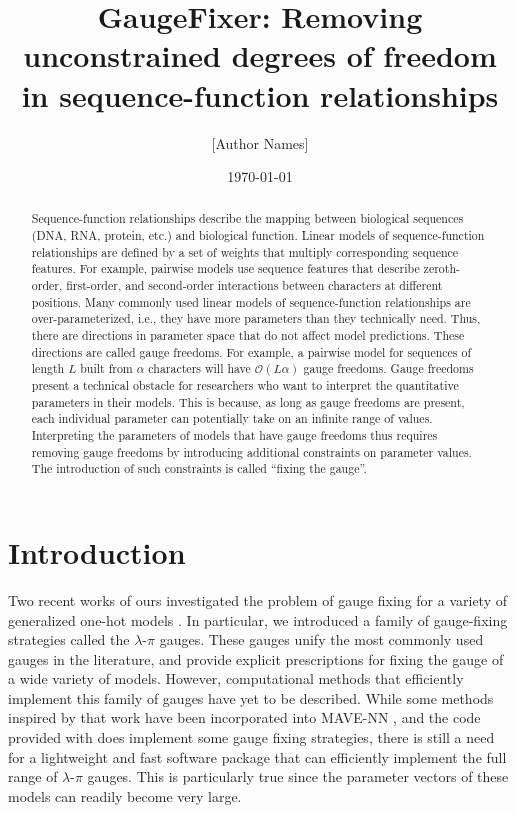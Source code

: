\documentclass[12pt,letterpaper]{article}
\title{GaugeFixer: Removing unconstrained degrees of freedom in sequence-function relationships}
\author{[Author Names]}
\date{\today}
\begin{document}
\maketitle

\begin{abstract}
Sequence-function relationships describe the mapping between biological sequences (DNA, RNA, protein, etc.) and biological function.
Linear models of sequence-function relationships are defined by a set of weights that multiply corresponding sequence features.
For example, pairwise models use sequence features that describe zeroth-order, first-order, and second-order interactions between characters at different positions. 
Many commonly used linear models of sequence-function relationships are over-parameterized, i.e., they have more parameters than they technically need. 
Thus, there are directions in parameter space that do not affect model predictions. These directions are called gauge freedoms. 
For example, a pairwise model for sequences of length $L$ built from $\alpha$ characters will have $\mathcal{O}(L\alpha)$ gauge freedoms. 
Gauge freedoms present a technical obstacle for researchers who want to interpret the quantitative parameters in their models. 
This is because, as long as gauge freedoms are present, each individual parameter can potentially take on an infinite range of values. 
Interpreting the parameters of models that have gauge freedoms thus requires removing gauge freedoms by introducing additional constraints on parameter values. 
The introduction of such constraints is called ``fixing the gauge''.
\end{abstract}

\section{Introduction}
Two recent works of ours investigated the problem of gauge fixing for a variety of generalized one-hot models \cite{ref1, ref2}.
In particular, we introduced a family of gauge-fixing strategies called the $\lambda$-$\pi$ gauges. These gauges unify the most commonly used gauges in the literature, and provide explicit prescriptions for fixing the gauge of a wide variety of models. However, computational methods that efficiently implement this family of gauges have yet to be described. While some methods inspired by that work have been incorporated into MAVE-NN \cite{mave-nn}, and the code provided with \cite{ref2} does implement some gauge fixing strategies, there is still a need for a lightweight and fast software package that can efficiently implement the full range of $\lambda$-$\pi$ gauges. This is particularly true since the parameter vectors of these models can readily become very large. 
\end{document}
